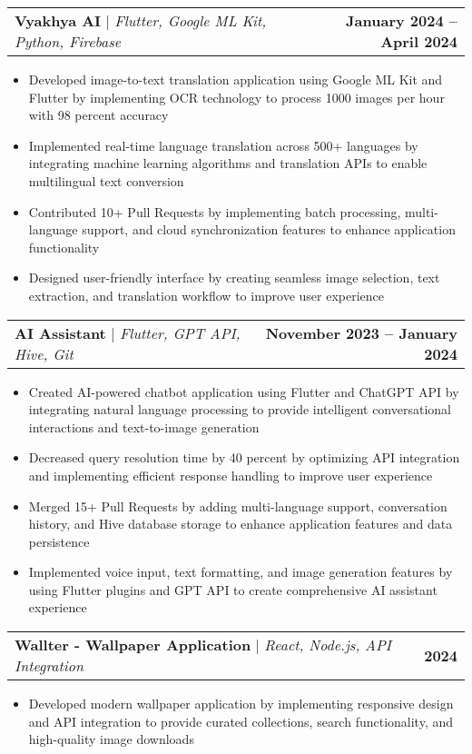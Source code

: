 \documentclass[a4paper,11pt]{article}
\makeatletter
\newcommand{\resumeItem}[1]{
  \item\small{
    {#1 \vspace{-2pt}}
  }
}
\newcommand{\resumeProjectHeading}[2]{
    \item
    \begin{tabular*}{1.001\textwidth}{l@{\extracolsep{\fill}}r}
      \small#1 & \textbf{\small #2}\\
    \end{tabular*}\vspace{-7pt}
}
\newcommand{\resumeItemListStart}{\begin{itemize}}
\newcommand{\resumeItemListEnd}{\end{itemize}\vspace{-5pt}}
\makeatother
\begin{document}
      \resumeProjectHeading
          {\textbf{Vyakhya AI} $|$ \emph{Flutter, Google ML Kit, Python, Firebase}}{January 2024 -- April 2024}
          \resumeItemListStart
            \resumeItem{Developed image-to-text translation application using Google ML Kit and Flutter by implementing OCR technology to process 1000 images per hour with 98 percent accuracy}
            \resumeItem{Implemented real-time language translation across 500+ languages by integrating machine learning algorithms and translation APIs to enable multilingual text conversion}
            \resumeItem{Contributed 10+ Pull Requests by implementing batch processing, multi-language support, and cloud synchronization features to enhance application functionality}
            \resumeItem{Designed user-friendly interface by creating seamless image selection, text extraction, and translation workflow to improve user experience}
          \resumeItemListEnd 
          \vspace{-13pt}
          
      \resumeProjectHeading
          {\textbf{AI Assistant} $|$ \emph{Flutter, GPT API, Hive, Git}}{November 2023 -- January 2024}
          \resumeItemListStart
            \resumeItem{Created AI-powered chatbot application using Flutter and ChatGPT API by integrating natural language processing to provide intelligent conversational interactions and text-to-image generation}
            \resumeItem{Decreased query resolution time by 40 percent by optimizing API integration and implementing efficient response handling to improve user experience}
            \resumeItem{Merged 15+ Pull Requests by adding multi-language support, conversation history, and Hive database storage to enhance application features and data persistence}
            \resumeItem{Implemented voice input, text formatting, and image generation features by using Flutter plugins and GPT API to create comprehensive AI assistant experience}
          \resumeItemListEnd 
          \vspace{-13pt}
          
      \resumeProjectHeading
          {\textbf{Wallter - Wallpaper Application} $|$ \emph{React, Node.js, API Integration}}{2024}
          \resumeItemListStart
            \resumeItem{Developed modern wallpaper application by implementing responsive design and API integration to provide curated collections, search functionality, and high-quality image downloads}
          \resumeItemListEnd 
          \vspace{-13pt}
          
\end{document}
